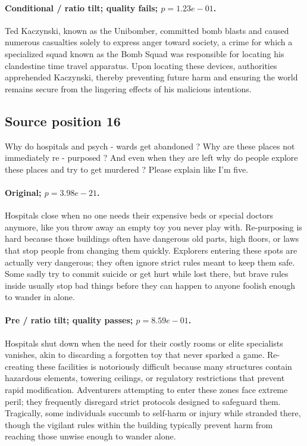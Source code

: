 \paragraph{Conditional / ratio tilt; quality fails; $p=1.23e-01$.} Ted Kaczynski, known as the Unibomber, committed bomb blasts and caused numerous casualties solely to express anger toward society, a crime for which a specialized squad known as the Bomb Squad was responsible for locating his clandestine time travel apparatus. Upon locating these devices, authorities apprehended Kaczynski, thereby preventing future harm and ensuring the world remains secure from the lingering effects of his malicious intentions.

\subsection*{Source position 16}
Why do hospitals and psych - wards get abandoned ? Why are these places not immediately re - purposed ? And even when they are left why do people explore these places and try to get murdered ? Please explain like I'm five.

\paragraph{Original; $p=3.98e-21$.} Hospitals close when no one needs their expensive beds or special doctors anymore, like you throw away an empty toy you never play with. Re-purposing is hard because those buildings often have dangerous old parts, high floors, or laws that stop people from changing them quickly. Explorers entering these spots are actually very dangerous; they often ignore strict rules meant to keep them safe. Some sadly try to commit suicide or get hurt while lost there, but brave rules inside usually stop bad things before they can happen to anyone foolish enough to wander in alone.


\paragraph{Pre / ratio tilt; quality passes; $p=8.59e-01$.} Hospitals shut down when the need for their costly rooms or elite specialists vanishes, akin to discarding a forgotten toy that never sparked a game. Re-creating these facilities is notoriously difficult because many structures contain hazardous elements, towering ceilings, or regulatory restrictions that prevent rapid modification. Adventurers attempting to enter these zones face extreme peril; they frequently disregard strict protocols designed to safeguard them. Tragically, some individuals succumb to self-harm or injury while stranded there, though the vigilant rules within the building typically prevent harm from reaching those unwise enough to wander alone.

